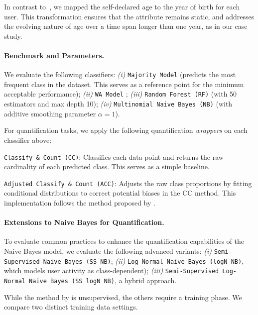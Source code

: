 In contrast to~\citet{waller2021quantifying}, we mapped the self-declared age to the year of birth for each user.
This transformation ensures that the attribute remains static, and addresses the evolving nature of age over a time span longer than one year, as in our case study.


\label{sec:setup}
\paragraph{Benchmark and Parameters.}
We evaluate the following classifiers:
\emph{(i)} \texttt{Majority Model} (predicts the most frequent class in the dataset. This serves as a reference point for the minimum acceptable performance); 
\emph{(ii)} \texttt{WA Model} \cite{waller2021quantifying}; 
\emph{(iii)} \texttt{Random Forest (RF)} (with 50 estimators and max depth 10);
\emph{(iv)} \texttt{Multinomial Naive Bayes (NB)} (with additive smoothing parameter $\alpha=1$).

For quantification tasks, we apply the following quantification \emph{wrappers} on each classifier above:
\begin{squishlist}
    \item \texttt{Classify \& Count (CC)}: Classifies each data point and returns the raw cardinality of each predicted class. This serves as a simple baseline.
    \item \texttt{Adjusted Classify \& Count (ACC)}: Adjusts the raw class proportions by fitting conditional distributions to correct potential biases in the CC method. This implementation follows the method proposed by \citet{moreo2021quapy}.
\end{squishlist} 


\paragraph{Extensions to Naive Bayes for Quantification.}
To evaluate common practices to enhance the quantification capabilities of the Naive Bayes model, we evaluate the following advanced variants:
\emph{(i)} \texttt{Semi-Supervised Naive Bayes (SS NB)};
\emph{(ii)} \texttt{Log-Normal Naive Bayes (logN NB)}, which models user activity as class-dependent);
\emph{(iii)} \texttt{Semi-Supervised Log-Normal Naive Bayes (SS logN NB)}, a hybrid approach.


While the method by \citet{waller2021quantifying} is unsupervised, the others require a training phase.
We compare two distinct training data settings.

